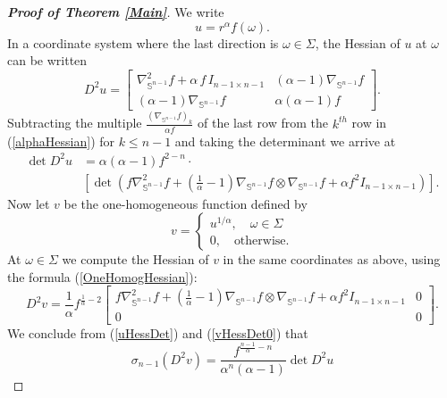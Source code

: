\documentclass{amsart}
\theoremstyle{definition}
\theoremstyle{remark}
\begin{document}
\begin{proof}[{\bf Proof of Theorem \ref{Main}}]
We write
$$u = r^{\alpha}f(\omega).$$
In a coordinate system where the last direction is $\omega \in \Sigma$, the Hessian of $u$ at $\omega$ can be written
\begin{equation}\label{alphaHessian}
D^2u = \begin{bmatrix}
     \nabla_{\mathbb{S}^{n-1}}^2f + \alpha\,f\,I_{n-1 \times n-1} & (\alpha - 1)\nabla_{\mathbb{S}^{n-1}}f \\ 
     (\alpha - 1)\nabla_{\mathbb{S}^{n-1}}f & \alpha(\alpha - 1)f
 \end{bmatrix}.
 \end{equation} 
Subtracting the multiple $\frac{\left(\nabla_{\mathbb{S}^{n-1}}f\right)_k}{\alpha f}$ of the last row from the $k^{th}$ row in (\ref{alphaHessian}) for $k \leq n-1$ and taking the determinant we arrive at
\begin{equation}\label{uHessDet}
\begin{split}
\det D^2u &= \alpha(\alpha -1)f^{2-n} \cdot \\
&\left[\det\left(f\nabla_{\mathbb{S}^{n-1}}^2f + \left(\frac{1}{\alpha}-1\right)\nabla_{\mathbb{S}^{n-1}}f \otimes \nabla_{\mathbb{S}^{n-1}}f + \alpha f^2I_{n-1 \times n-1}\right)\right].
\end{split}
\end{equation}
Now let $v$ be the one-homogeneous function defined by
$$v = \begin{cases}
u^{1/\alpha}, \quad \omega \in \Sigma \\
0, \quad \text{otherwise.}
\end{cases}$$
At $\omega \in \Sigma$ we compute the Hessian of $v$ in the same coordinates as above, using the formula (\ref{OneHomogHessian}):
 \begin{equation}\label{vHessDet0}
 D^2v = \frac{1}{\alpha}f^{\frac{1}{\alpha}-2}
 \begin{bmatrix}
     f\nabla_{\mathbb{S}^{n-1}}^2f + \left(\frac{1}{\alpha}-1\right)\nabla_{\mathbb{S}^{n-1}}f \otimes \nabla_{\mathbb{S}^{n-1}}f + \alpha f^2I_{n-1 \times n-1} & 0 \\ 
     0 & 0
 \end{bmatrix}.
 \end{equation}
We conclude from (\ref{uHessDet}) and (\ref{vHessDet0}) that
\begin{equation}\label{vHessDet}
 \sigma_{n-1}(D^2v) = \frac{f^{\frac{n-1}{\alpha} - n}}{\alpha^n(\alpha-1)}\det D^2u
\end{equation}

\end{proof}
\end{document}
